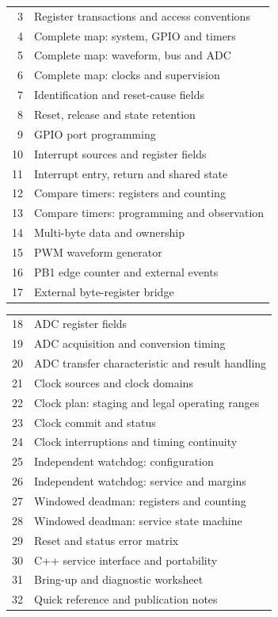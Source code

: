 \documentclass[10pt]{article}
\begin{document}
\noindent\begin{minipage}[t]{.485\linewidth}\small\par\noindent\begin{tabularx}{\linewidth}{rY}
3 & Register transactions and access conventions \\[4pt]
4 & Complete map: system, GPIO and timers \\[4pt]
5 & Complete map: waveform, bus and ADC \\[4pt]
6 & Complete map: clocks and supervision \\[4pt]
7 & Identification and reset-cause fields \\[4pt]
8 & Reset, release and state retention \\[4pt]
9 & GPIO port programming \\[4pt]
10 & Interrupt sources and register fields \\[4pt]
11 & Interrupt entry, return and shared state \\[4pt]
12 & Compare timers: registers and counting \\[4pt]
13 & Compare timers: programming and observation \\[4pt]
14 & Multi-byte data and ownership \\[4pt]
15 & PWM waveform generator \\[4pt]
16 & PB1 edge counter and external events \\[4pt]
17 & External byte-register bridge \\[4pt]\end{tabularx}\end{minipage}\hfill\begin{minipage}[t]{.485\linewidth}\small\par\noindent\begin{tabularx}{\linewidth}{rY}
18 & ADC register fields \\[4pt]
19 & ADC acquisition and conversion timing \\[4pt]
20 & ADC transfer characteristic and result handling \\[4pt]
21 & Clock sources and clock domains \\[4pt]
22 & Clock plan: staging and legal operating ranges \\[4pt]
23 & Clock commit and status \\[4pt]
24 & Clock interruptions and timing continuity \\[4pt]
25 & Independent watchdog: configuration \\[4pt]
26 & Independent watchdog: service and margins \\[4pt]
27 & Windowed deadman: registers and counting \\[4pt]
28 & Windowed deadman: service state machine \\[4pt]
29 & Reset and status error matrix \\[4pt]
30 & C++ service interface and portability \\[4pt]
31 & Bring-up and diagnostic worksheet \\[4pt]
32 & Quick reference and publication notes \\[4pt]\end{tabularx}\end{minipage}
\end{document}

